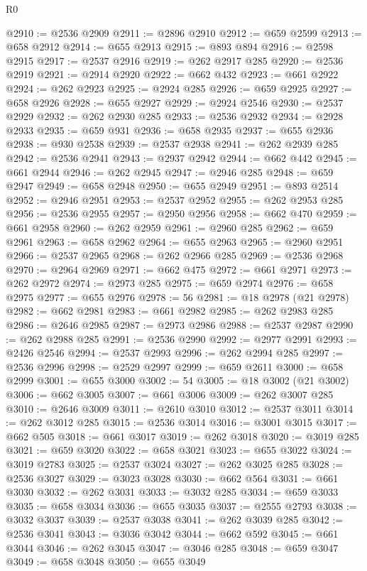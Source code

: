 \begin{lexlean}{R0}
\begin{coremodule}
@2910 := @2536 @2909
@2911 := @2896 @2910
@2912 := @659 @2599
@2913 := @658 @2912
@2914 := @655 @2913
@2915 := @893 @894
@2916 := @2598 @2915
@2917 := @2537 @2916
@2919 := @262 @2917 @285
@2920 := @2536 @2919
@2921 := @2914 @2920
@2922 := @662 @432
@2923 := @661 @2922
@2924 := @262 @2923
@2925 := @2924 @285
@2926 := @659 @2925
@2927 := @658 @2926
@2928 := @655 @2927
@2929 := @2924 @2546
@2930 := @2537 @2929
@2932 := @262 @2930 @285
@2933 := @2536 @2932
@2934 := @2928 @2933
@2935 := @659 @931
@2936 := @658 @2935
@2937 := @655 @2936
@2938 := @930 @2538
@2939 := @2537 @2938
@2941 := @262 @2939 @285
@2942 := @2536 @2941
@2943 := @2937 @2942
@2944 := @662 @442
@2945 := @661 @2944
@2946 := @262 @2945
@2947 := @2946 @285
@2948 := @659 @2947
@2949 := @658 @2948
@2950 := @655 @2949
@2951 := @893 @2514
@2952 := @2946 @2951
@2953 := @2537 @2952
@2955 := @262 @2953 @285
@2956 := @2536 @2955
@2957 := @2950 @2956
@2958 := @662 @470
@2959 := @661 @2958
@2960 := @262 @2959
@2961 := @2960 @285
@2962 := @659 @2961
@2963 := @658 @2962
@2964 := @655 @2963
@2965 := @2960 @2951
@2966 := @2537 @2965
@2968 := @262 @2966 @285
@2969 := @2536 @2968
@2970 := @2964 @2969
@2971 := @662 @475
@2972 := @661 @2971
@2973 := @262 @2972
@2974 := @2973 @285
@2975 := @659 @2974
@2976 := @658 @2975
@2977 := @655 @2976
@2978 := 56
@2981 := @18 @2978 (@21 @2978)
@2982 := @662 @2981
@2983 := @661 @2982
@2985 := @262 @2983 @285
@2986 := @2646 @2985
@2987 := @2973 @2986
@2988 := @2537 @2987
@2990 := @262 @2988 @285
@2991 := @2536 @2990
@2992 := @2977 @2991
@2993 := @2426 @2546
@2994 := @2537 @2993
@2996 := @262 @2994 @285
@2997 := @2536 @2996
@2998 := @2529 @2997
@2999 := @659 @2611
@3000 := @658 @2999
@3001 := @655 @3000
@3002 := 54
@3005 := @18 @3002 (@21 @3002)
@3006 := @662 @3005
@3007 := @661 @3006
@3009 := @262 @3007 @285
@3010 := @2646 @3009
@3011 := @2610 @3010
@3012 := @2537 @3011
@3014 := @262 @3012 @285
@3015 := @2536 @3014
@3016 := @3001 @3015
@3017 := @662 @505
@3018 := @661 @3017
@3019 := @262 @3018
@3020 := @3019 @285
@3021 := @659 @3020
@3022 := @658 @3021
@3023 := @655 @3022
@3024 := @3019 @2783
@3025 := @2537 @3024
@3027 := @262 @3025 @285
@3028 := @2536 @3027
@3029 := @3023 @3028
@3030 := @662 @564
@3031 := @661 @3030
@3032 := @262 @3031
@3033 := @3032 @285
@3034 := @659 @3033
@3035 := @658 @3034
@3036 := @655 @3035
@3037 := @2555 @2793
@3038 := @3032 @3037
@3039 := @2537 @3038
@3041 := @262 @3039 @285
@3042 := @2536 @3041
@3043 := @3036 @3042
@3044 := @662 @592
@3045 := @661 @3044
@3046 := @262 @3045
@3047 := @3046 @285
@3048 := @659 @3047
@3049 := @658 @3048
@3050 := @655 @3049

\end{coremodule}
\end{lexlean}
